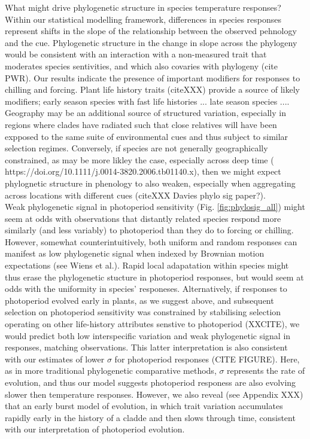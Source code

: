 \documentclass{article}\usepackage[]{graphicx}\usepackage[]{color}
\begin{document}
What might drive phylogenetic structure in species temperature responses? Within our statistical modelling framework, differences in species responses represent shifts in the slope of the relationship between the observed pehnology and the cue. Phylogenetic structure in the change in slope across the phylogeny would be consistent with an interaction with a non-measured trait that moderates species sentivities, and which also covaries with phylogeny (cite PWR). Our results indicate the presence of important modifiers for responses to chilling and forcing. Plant life history traits (citeXXX) provide a source of likely modifiers; early season species with fast life histories ... late season species .... Geography may be an additional source of structured variation, especially in regions where clades have radiated such that close relatives will have been expposed to the same suite of environmental cues and thus subject to similar selection regimes. Conversely, if species are not generally geographically constrained, as may be more likley the case, especially across deep time ( https://doi.org/10.1111/j.0014-3820.2006.tb01140.x), then we might expect phylognetic structure in phenology to also weaken, especially when aggregating across locations with different cues (citeXXX Davies phylo sig paper?).
\\

Weak phylogenetic signal in photoperiod sensitivity (Fig. \ref{fig:phylosig_all}) might seem at odds with observations that distantly related species respond more similarly (and less variably) to photoperiod than they do to forcing or chilling. However, somewhat counterintuitively, both uniform and random responses can manifest as low phylogenetic signal when indexed by Brownian motion expectations (see Wiens et al.). Rapid local adapatation within species might thus erase the phylogenetic stucture in photoperiod responses, but would seem at odds with the uniformity in species' responeses. Alternatively, if responses to photoperiod evolved early in plants, as we suggest above, and subsequent selection on photoperiod sensitivity was constrained by stabilising selection operating on other life-history attributes senstive to photoperiod (XXCITE), we would predict both low interspecific variation and weak phylogenetic signal in responses, matching observations. This latter interpretation is also consistent with our estimates of lower $\sigma$ for photoperiod responses (CITE FIGURE). Here, as in more traditional phylogenetic comparative methods, $\sigma$ represents the rate of evolution, and thus our model suggests photoperiod responess are also evolving slower then temperature responses. However, we also reveal (see Appendix XXX) that an early burst model of evolution, in which trait variation accumulates rapidly early in the history of a cladde and then slows through time, consistent with our interpretation of photoperiod evolution.
\\
\end{document}
